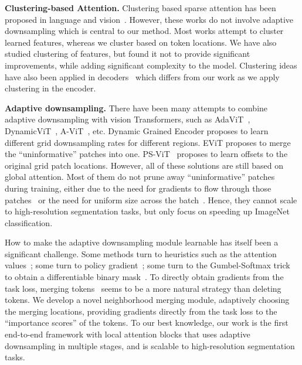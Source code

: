\documentclass[10pt,twocolumn,letterpaper]{article}
\begin{document}
\noindent\textbf{Clustering-based Attention.} Clustering based sparse attention has been proposed in language and vision~\cite{roy2021efficient,vyas2020fast,zheng2020end,wang2021cluster}. However, these works do not involve adaptive downsampling which is central to our method. Most works attempt to cluster learned features, whereas we cluster based on token locations. We have also studied clustering of features, but found it not to provide significant improvements, while adding significant complexity to the model. Clustering ideas have also been applied in decoders~\cite{yu2022k,hcformer} which differs from our work as we apply clustering in the encoder.





\noindent\textbf{Adaptive downsampling.}
There have been many attempts to combine adaptive downsampling with vision Transformers, such as AdaViT~\cite{adavit}, DynamicViT~\cite{dynamicvit}, A-ViT~\cite{avit}, etc. Dynamic Grained Encoder\cite{song2021dynamic} proposes to learn different grid downsampling rates for different regions. EViT\cite{notall} proposes to merge the ``uninformative'' patches into one. PS-ViT~\cite{psvit} proposes to learn offsets to the original grid patch locations. However, all of these solutions are still based on global attention. Most of them do not prune away ``uninformative'' patches during training, either due to the need for gradients to flow through those patches~\cite{dynamicvit} or the need for uniform size across the batch~\cite{avit}. Hence, they cannot scale to high-resolution segmentation tasks, but only focus on speeding up ImageNet classification.

How to make the adaptive downsampling module learnable has itself been a significant challenge. Some methods turn to heuristics such as the attention values~\cite{adaptivetoken}; some turn to policy gradient~\cite{iared}; some turn to the Gumbel-Softmax trick~\cite{gumbel} to obtain a differentiable binary mask~\cite{adavit, dynamicvit}. To directly obtain gradients from the task loss, merging tokens~\cite{tokenlearner, notall} seems to be a more natural strategy than deleting tokens. We develop a novel neighborhood merging module, adaptively choosing the merging locations, providing gradients directly from the task loss to the ``importance scores'' of the tokens.
To our best knowledge, our work is the first end-to-end framework with local attention blocks that uses adaptive downsampling in multiple stages, and is scalable to high-resolution segmentation tasks.
\end{document}
